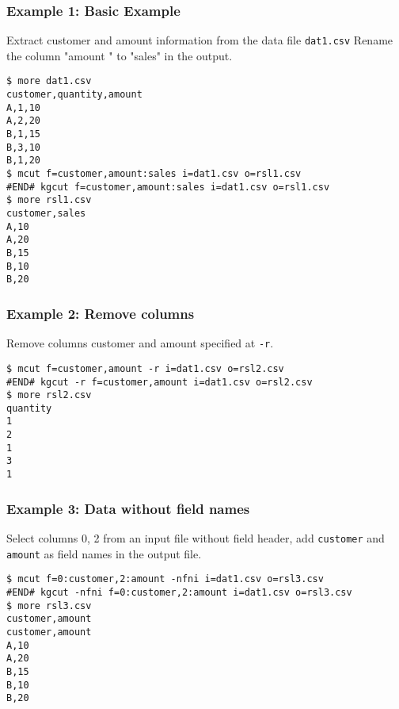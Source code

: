 \subsubsection*{Example 1: Basic Example}

Extract customer and amount information from the data file \verb|dat1.csv|
Rename the column "amount " to "sales" in the output.


\begin{Verbatim}[baselinestretch=0.7,frame=single]
$ more dat1.csv
customer,quantity,amount
A,1,10
A,2,20
B,1,15
B,3,10
B,1,20
$ mcut f=customer,amount:sales i=dat1.csv o=rsl1.csv
#END# kgcut f=customer,amount:sales i=dat1.csv o=rsl1.csv
$ more rsl1.csv
customer,sales
A,10
A,20
B,15
B,10
B,20
\end{Verbatim}
\subsubsection*{Example 2: Remove columns}

Remove columns customer and amount specified at \verb|-r|.


\begin{Verbatim}[baselinestretch=0.7,frame=single]
$ mcut f=customer,amount -r i=dat1.csv o=rsl2.csv
#END# kgcut -r f=customer,amount i=dat1.csv o=rsl2.csv
$ more rsl2.csv
quantity
1
2
1
3
1
\end{Verbatim}
\subsubsection*{Example 3: Data without field names}

Select columns 0, 2 from an input file without field header, add \verb|customer| and \verb|amount| as field names in the output file.


\begin{Verbatim}[baselinestretch=0.7,frame=single]
$ mcut f=0:customer,2:amount -nfni i=dat1.csv o=rsl3.csv
#END# kgcut -nfni f=0:customer,2:amount i=dat1.csv o=rsl3.csv
$ more rsl3.csv
customer,amount
customer,amount
A,10
A,20
B,15
B,10
B,20
\end{Verbatim}
